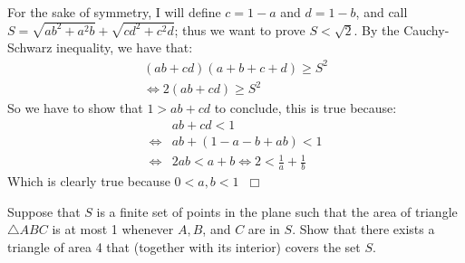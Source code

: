 \begin{solution}
    For the sake of symmetry, I will define $c=1-a$ and $d=1-b$, and call $S=\sqrt{ab^2+a^2b}+\sqrt{cd^2+c^2d}$; thus we want to prove $S<\sqrt2$. By the Cauchy-Schwarz inequality, we have that:
    \begin{align*}
        (ab+cd)(a+b+c+d) \geq S^2\\
        \iff 2(ab+cd) \geq S^2
    \end{align*}
    So we have to show that $1>ab+cd$ to conclude, this is true because:
    \begin{align*}
        &ab+cd<1 \\
         \iff &ab+(1-a-b+ab)<1 \\
        \iff &2ab<a+b \iff 2 < \frac{1}{a} + \frac{1}{b}
    \end{align*}
    Which is clearly true because $0<a,b<1 \hspace{7pt} \Box$
\end{solution}

\begin{problem}[G][6][Putnam 2016 /B3]
    Suppose that $S$ is a finite set of points in the plane such that the area of triangle $\triangle ABC$ is at most 1 whenever $A, B$, and $C$ are in $S$. Show that there exists a triangle of area 4 that (together with its interior) covers the set $S$.
\end{problem}

